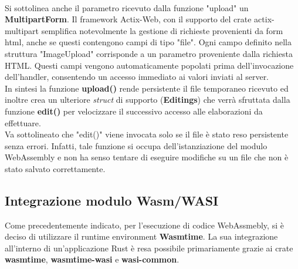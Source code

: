 \\Si sottolinea anche il parametro ricevuto dalla funzione "upload" un \textbf{MultipartForm}.
Il framework Actix-Web, con il supporto del crate actix-multipart semplifica notevolmente la gestione di richieste provenienti da form html, anche se questi contengono campi di tipo "file".
Ogni campo definito nella struttura "ImageUpload" corrisponde a un parametro proveniente dalla richiesta HTML. Questi campi vengono automaticamente popolati prima dell'invocazione dell'handler, consentendo un accesso immediato ai valori inviati al server.
\\In sintesi la funzione \textbf{upload()} rende persistente il file temporaneo ricevuto ed inoltre crea un ulteriore \emph{struct} di supporto (\textbf{Editings}) che verrà sfruttata dalla funzione \textbf{edit()} per velocizzare il successivo accesso alle elaborazioni da effettuare.
\\Va sottolineato che "edit()" viene invocata solo se il file è stato reso persistente senza errori. Infatti, tale funzione si occupa dell'istanziazione del modulo WebAssembly e non ha senso tentare di eseguire modifiche su un file che non è stato salvato correttamente.
\subsection{Integrazione modulo Wasm/WASI}
Come precedentemente indicato, per l'esecuzione di codice WebAssmebly, si è deciso di utilizzare il runtime environment \textbf{Wasmtime}.
La sua integrazione all'interno di un'applicazione Rust è resa possibile primariamente grazie ai crate \textbf{wasmtime}, \textbf{wasmtime-wasi} e \textbf{wasi-common}.
